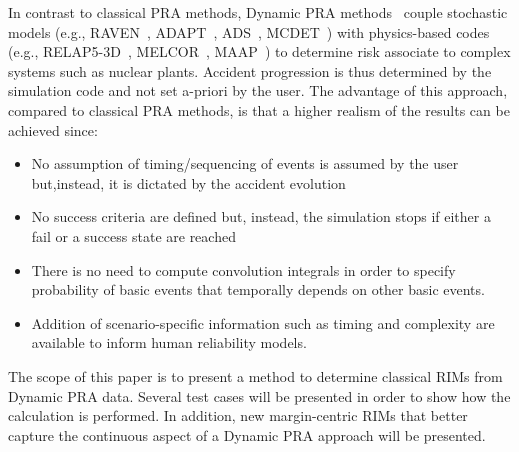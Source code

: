 In contrast to classical PRA methods, Dynamic PRA methods~\cite{DEVOOGHT_DynamicPRA} couple 
stochastic models 
(e.g., RAVEN~\cite{RAVEN_PSAM_2014}, ADAPT~\cite{ADAPT}, ADS~\cite{ADS}, MCDET~\cite{MCDET}) 
with physics-based 
codes (e.g., RELAP5-3D~\cite{relap5}, MELCOR~\cite{Melcor}, MAAP~\cite{maap}) to determine risk 
associate to 
complex systems such as nuclear plants. Accident progression is thus determined by the 
simulation code and not set a-priori by the user. The advantage of this approach, 
compared to classical PRA methods, is that a higher realism of the results can be achieved since:
\begin{itemize}
  \item No assumption of timing/sequencing of events is assumed by the user but,instead, it is
        dictated by the 
        accident evolution
  \item No success criteria are defined but, instead, the simulation stops if either a fail 
        or a success state are reached
  \item There is no need to compute convolution integrals in order to specify probability of 
        basic events that temporally depends on other basic events.
  \item Addition of scenario-specific information such as timing and complexity are available to
        inform human reliability models.
\end{itemize}

The scope of this paper is to present a method to determine classical RIMs from Dynamic PRA 
data. Several test cases will be presented in order to show how the calculation is performed. 
In addition, new margin-centric RIMs that better capture the continuous aspect of a Dynamic 
PRA approach will be presented.

